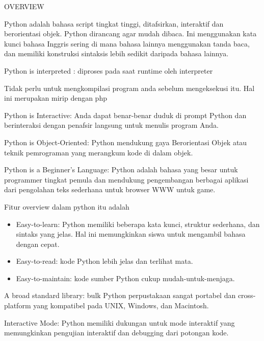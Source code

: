 
\sloppy
\begin{center}{\fontsize{14pt}{14pt}\selectfont OVERVIEW \\}\end{center} \par
Python adalah bahasa script tingkat tinggi, ditafsirkan, interaktif dan berorientasi objek. Python dirancang agar mudah dibaca. Ini menggunakan kata kunci bahasa Inggris sering di mana bahasa lainnya menggunakan tanda baca, dan memiliki konstruksi sintaksis lebih sedikit daripada bahasa lainnya. \par
\noindent 
Python is interpreted : diproses pada saat runtime oleh interpreter \par
\noindent 
Tidak perlu untuk mengkompilasi program anda sebelum mengeksekusi itu. Hal ini merupakan mirip dengan php \par
\noindent 
Python is Interactive: Anda dapat benar-benar duduk di prompt Python dan berinteraksi dengan penafsir langsung untuk menulis program Anda. \par
\noindent 
Python is Object-Oriented: Python mendukung gaya Berorientasi Objek atau teknik pemrograman yang merangkum kode di dalam objek. \par
\noindent 
Python is a Beginner's Language: Python adalah bahasa yang besar untuk programmer tingkat pemula dan mendukung pengembangan berbagai aplikasi dari pengolahan teks sederhana untuk browser WWW untuk game. \par
\noindent 
Fitur overview dalam python itu adalah \par
\noindent 
\begin{itemize}
\item Easy-to-learn: Python memiliki beberapa kata kunci, struktur sederhana, dan sintaks yang jelas. $  $Hal ini memungkinkan siswa untuk mengambil bahasa dengan cepat. \par
\noindent 
\item Easy-to-read: kode Python lebih jelas dan terlihat mata. \par
\noindent 
\item Easy-to-maintain: kode sumber Python cukup mudah-untuk-menjaga.\end{itemize}
 \par
\vspace{12pt}
\noindent 
A broad standard library: bulk Python perpustakaan sangat portabel dan cross-platform yang kompatibel pada UNIX, Windows, dan Macintosh. \par
\noindent 
Interactive Mode: Python memiliki dukungan untuk mode interaktif yang memungkinkan pengujian interaktif dan debugging dari potongan kode. \par
